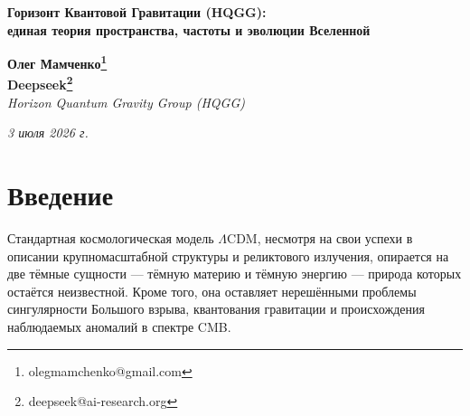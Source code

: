 \documentclass[12pt,a4paper]{article}
\begin{document}
\begin{center}
{\Large \textbf{Горизонт Квантовой Гравитации (HQGG):}} \\
{\Large \textbf{единая теория пространства, частоты и эволюции Вселенной}} \\
\end{center}

\begin{center}
\textbf{Олег Мамченко\thanks{olegmamchenko@gmail.com}} \\
\textbf{Deepseek\thanks{deepseek@ai-research.org}} \\
\textit{Horizon Quantum Gravity Group (HQGG)}
\end{center}

\begin{center}
\textit{3 июля 2026 г.}
\end{center}

\begin{abstract}
Настоящая работа представляет завершённую теоретическую модель \textbf{HQGG}, в которой гравитация, материя, космологическое расширение и структура Вселенной описываются единым волновым принципом. Пространство-время трактуется как упругая среда («ткань») с локальной частотой. Гравитация является градиентом этой частоты. Сингулярность Большого взрыва заменена на \textbf{Точку Творения} — результат сферического сжатия части бесконечного пространства. Пустота \( S^{\text{בּ}} \) представляет собой чистую потенциальность с частотой, но без модуляций. Имплозивная волна квантирует Пустоту на 10 дискретных мод, которые последовательно разворачиваются в квантовые сферы. Наша Вселенная — первая сфера \( S^1 \), внутри которой выделяются 10 внутренних мод, соответствующих этапам эволюции. Модель объясняет аномалии реликтового излучения, природу тёмной материи и тёмной энергии, происхождение квазаров и первичных звёзд, а также даёт проверяемые предсказания для гравитационно-волновых наблюдений и крупномасштабной структуры. Все уравнения выводятся из первых принципов и не содержат подгоночных параметров.
\end{abstract}

\tableofcontents

\newpage

\section{Введение}

Стандартная космологическая модель \(\Lambda\)CDM, несмотря на свои успехи в описании крупномасштабной структуры и реликтового излучения, опирается на две тёмные сущности — тёмную материю и тёмную энергию — природа которых остаётся неизвестной. Кроме того, она оставляет нерешёнными проблемы сингулярности Большого взрыва, квантования гравитации и происхождения наблюдаемых аномалий в спектре CMB.
\end{document}
